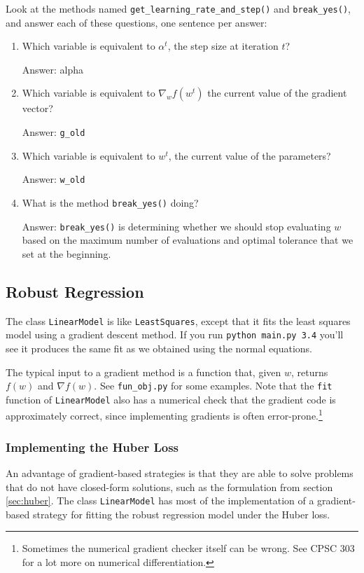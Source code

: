 \documentclass{article}
\newcommand{\blu}[1]{{\textcolor{blu}{#1}}}
\newcommand{\gre}[1]{\textcolor{gre}{#1}}
\newcommand\ans[1]{\par\gre{Answer: #1}}
\let\ask\blu
\begin{document}
Look at the methods named \texttt{get\_learning\_rate\_and\_step()} and \texttt{break\_yes()}, \ask{and answer each of these questions, one sentence per answer:}
\begin{enumerate}
	\item Which variable is equivalent to $\alpha^t$, the step size at iteration $t$?
        \ans{alpha}
	\item Which variable is equivalent to $\nabla_w f(w^t)$ the current value of the gradient vector?
        \ans{\texttt{g\_old}}
	\item Which variable is equivalent to $w^t$, the current value of the parameters?
        \ans{\texttt{w\_old}}
	\item What is the method \texttt{break\_yes()} doing?
        \ans{\texttt{break\_yes()} is determining whether we should stop evaluating $w$ based on the maximum number of evaluations and optimal tolerance that we set at the beginning.}
\end{enumerate}

\pagebreak

\subsection{Robust Regression}

The class \texttt{LinearModel} is like \texttt{LeastSquares}, except that it fits the least squares model using a gradient descent method. If you run \verb|python main.py 3.4| you'll see it produces the same fit as we obtained using the normal equations.

The typical input to a gradient method is a function that, given $w$, returns $f(w)$ and $\nabla f(w)$. See \texttt{fun\_obj.py} for some examples. Note that the \texttt{fit} function of \texttt{LinearModel} also has a numerical check that the gradient code is approximately correct, since implementing gradients is often error-prone.\footnote{Sometimes the numerical gradient checker itself can be wrong. See CPSC 303 for a lot more on numerical differentiation.}

\subsubsection{Implementing the Huber Loss}
An advantage of gradient-based strategies is that they are able to solve
problems that do not have closed-form solutions, such as the formulation from section \ref{sec:huber}. The class \texttt{LinearModel} has most of the implementation of a gradient-based strategy for fitting the robust regression model under the Huber loss.
\end{document}
